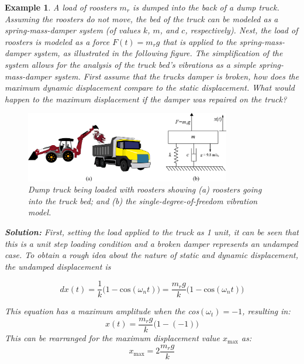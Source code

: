 \documentclass[12pt,letter]{article}
\newtheorem{ex}{Example}
\numberwithin{ex}{section} %
\newenvironment{example}{\begin{mdframed}[middlelinewidth=0.5mm]\begin{ex}\normalfont}{\end{ex}\end{mdframed}}
\numberwithin{re}{section} %
\begin{document}
\begin{example}
A load of roosters $m_r$ is dumped into the back of a dump truck. Assuming the roosters do not move, the bed of the truck can be modeled as a spring-mass-damper system (of values $k$, $m$, and $c$, respectively). Nest, the load of roosters is modeled as a force $F(t) = m_r g$ that is applied to the spring-mass-damper system, as illustrated in the following figure. The simplification of the system allows for the analysis of the truck bed's vibrations as a simple spring-mass-damper system. First assume that the trucks damper is broken, how does the maximum dynamic displacement compare to the static displacement. What would happen to the maximum displacement if the damper was repaired on the truck? %

\begin{figure}[H]
	\centering
	\includegraphics[width=0.8\textwidth]{../Figures/dump_truck_example.png}
	\caption{Dump truck being loaded with roosters showing (a) roosters going into the truck bed; and (b) the single-degree-of-freedom vibration model.}
\end{figure}

\noindent\textbf{Solution:} First, setting the load applied to the truck as 1 unit, it can be seen that this is a unit step loading condition and a broken damper represents an undamped case. To obtain a rough idea about the nature of static and dynamic displacement, the undamped displacement is

\begin{equation}d
	x(t) = \frac{1}{k}\big(1-\text{cos}(\omega_n t)\big) = \frac{m_rg}{k}\big(1-\text{cos}(\omega_n t)\big)
\end{equation}
 
This equation has a maximum amplitude when the cos$(\omega_t)=-1$, resulting in:
\begin{equation}
	x(t) = \frac{m_rg}{k}\big(1-(-1)\big)
\end{equation}
This can be rearranged for the maximum displacement value $x_\text{max} $ as:
\begin{equation}
	x_\text{max} = 2\frac{m_rg}{k}
\end{equation} 


\end{example}
\end{document}
